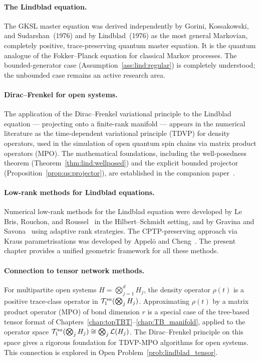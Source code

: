 \paragraph{The Lindblad equation.}
The GKSL master equation was derived independently by
Gorini, Kossakowski, and Sudarshan~(1976) and by Lindblad~(1976) as
the most general Markovian, completely positive, trace-preserving
quantum master equation. It is the quantum analogue of the Fokker--Planck
equation for classical Markov processes. The bounded-generator case
(Assumption~\ref{ass:lind:regular}) is completely understood;
the unbounded case remains an active research area.

\paragraph{Dirac--Frenkel for open systems.}
The application of the Dirac--Frenkel variational principle to the
Lindblad equation — projecting onto a finite-rank manifold — appears
in the numerical literature as the time-dependent variational principle
(TDVP) for density operators, used in the simulation of open quantum
spin chains via matrix product operators (MPO). The mathematical
foundations, including the well-posedness theorem
(Theorem~\ref{thm:lind:wellposed}) and the explicit bounded projector
(Proposition~\ref{prop:qs:projector}), are established in the companion
paper~\cite{AcevedoFalco2026}.

\paragraph{Low-rank methods for Lindblad equations.}
Numerical low-rank methods for the Lindblad equation were developed
by Le Bris, Rouchon, and Roussel~\cite{LeBrisRouchon2013,LeBrisRouchonRoussel2015}
in the Hilbert--Schmidt setting, and by Gravina and Savona~\cite{GravinaSavona2024}
using adaptive rank strategies. The CPTP-preserving approach via Kraus
parametrisations was developed by Appelö and Cheng~\cite{AppeloChengo2024}.
The present chapter provides a unified geometric framework for all
these methods.

\paragraph{Connection to tensor network methods.}
For multipartite open systems $H = \bigotimes_{j=1}^d H_j$, the density
operator $\rho(t)$ is a positive trace-class operator in
$\mathcal{T}_{1}^{sa}(\bigotimes_j H_j)$. Approximating $\rho(t)$ by a matrix
product operator (MPO) of bond dimension $r$ is a special case of
the tree-based tensor format of Chapters~\ref{chap:topTBT}--\ref{chap:TB_manifold},
applied to the operator space $\mathcal{T}_{1}^{sa}(\bigotimes_j H_j) \cong
\bigotimes_j \mathcal{L}(H_j)$. The Dirac--Frenkel principle on this space
gives a rigorous foundation for TDVP-MPO algorithms for open systems.
This connection is explored in Open Problem~\ref{prob:lindblad_tensor}.
